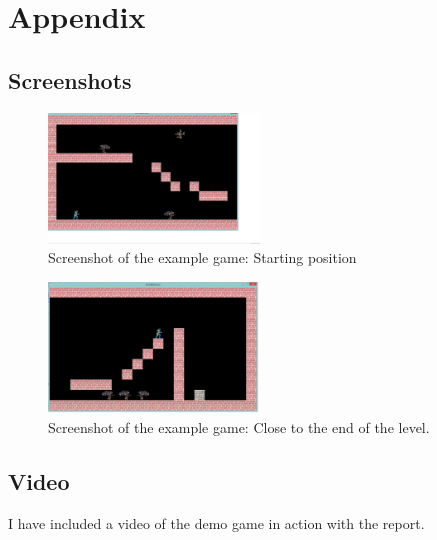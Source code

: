 \pagebreak
\section{Appendix}
\subsection{Screenshots}
\begin{figure}[h!]
  \centering
    \includegraphics[width=0.5\textwidth]{Screenshots/Start}
  \caption{Screenshot of the example game: Starting position}
\end{figure}
\begin{figure}[h!]
  \centering
    \includegraphics[width=0.5\textwidth]{Screenshots/End}
  \caption{Screenshot of the example game: Close to the end of the level.}
\end{figure}
\subsection{Video}
I have included a video of the demo game in action with the report.